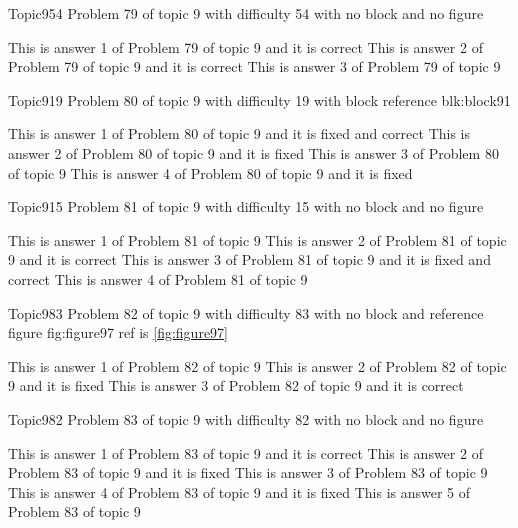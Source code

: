 \documentclass[master]{exam}
\begin{document}
\begin{problem}{Topic9}{54}
	Problem 79 of topic 9 with difficulty 54 with no block and no figure
	\begin{answers}
		\answer[correct] This is answer 1 of Problem 79 of topic 9 and it is correct
		\answer[correct] This is answer 2 of Problem 79 of topic 9 and it is correct
		\answer This is answer 3 of Problem 79 of topic 9 
	\end{answers}
\end{problem}

\begin{problem}[requires=blk:block91]{Topic9}{19}
	Problem 80 of topic 9 with difficulty 19 with block reference blk:block91
	\begin{answers}
		 This is answer 1 of Problem 80 of topic 9 and it is fixed and correct
		\answer[fixed] This is answer 2 of Problem 80 of topic 9 and it is fixed
		\answer This is answer 3 of Problem 80 of topic 9 
		\answer[fixed] This is answer 4 of Problem 80 of topic 9 and it is fixed
	\end{answers}
\end{problem}

\begin{problem}{Topic9}{15}
	Problem 81 of topic 9 with difficulty 15 with no block and no figure
	\begin{answers}
		\answer This is answer 1 of Problem 81 of topic 9 
		\answer[correct] This is answer 2 of Problem 81 of topic 9 and it is correct
		 This is answer 3 of Problem 81 of topic 9 and it is fixed and correct
		\answer This is answer 4 of Problem 81 of topic 9 
	\end{answers}
\end{problem}

\begin{problem}{Topic9}{83}
	Problem 82 of topic 9 with difficulty 83 with no block and reference figure fig:figure97 ref is \ref{fig:figure97}
	\begin{answers}
		\answer This is answer 1 of Problem 82 of topic 9 
		\answer[fixed] This is answer 2 of Problem 82 of topic 9 and it is fixed
		\answer[correct] This is answer 3 of Problem 82 of topic 9 and it is correct
	\end{answers}
\end{problem}

\begin{problem}{Topic9}{82}
	Problem 83 of topic 9 with difficulty 82 with no block and no figure
	\begin{answers}
		\answer[correct] This is answer 1 of Problem 83 of topic 9 and it is correct
		\answer[fixed] This is answer 2 of Problem 83 of topic 9 and it is fixed
		\answer This is answer 3 of Problem 83 of topic 9 
		\answer[fixed] This is answer 4 of Problem 83 of topic 9 and it is fixed
		\answer This is answer 5 of Problem 83 of topic 9 
	\end{answers}
\end{problem}
\end{document}
